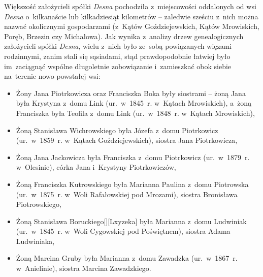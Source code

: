 Większość założycieli spółki \emph{Desna} pochodziła z~miejscowości oddalonych
od wsi \emph{Desna} o~kilkanaście lub kilkadziesiąt kilometrów -- zaledwie
sześciu z~nich można nazwać okolicznymi gospodarzami (z~Kątów Goździejewskich,
Kątów Mrowiskich, Poręb, Brzezin czy Michałowa). Jak wynika z~analizy drzew
genealogicznych założycieli spółki \emph{Desna}, wielu z~nich było ze~sobą
powiązanych więzami rodzinnymi, zanim stali się sąsiadami, stąd prawdopodobnie
łatwiej było im~zaciągnąć wspólne długoletnie zobowiązanie i~zamieszkać obok
siebie na~terenie nowo powstałej wsi:

\begin{itemize}
    \item Żony Jana Piotrkowicza oraz Franciszka
    Boka były siostrami -- żoną
    Jana była Krystyna
    z~domu Link (ur.~w~1845~r. w~Kątach Mrowiskich), a~żoną
    Franciszka była Teofila
    z~domu Link (ur.~w~1848~r. w~Kątach Mrowiskich),
    \item Żoną Stanisława Wichrowskiego była Józefa z~domu Piotrkowicz (ur.~w~1859~r. w~Kątach Goździejewskich),
    siostra Jana Piotrkowicza,
    \item Żoną Jana Jackowicza była
    Franciszka
    z~domu Piotrkowicz (ur.~w~1879~r. w~Olesinie), córka
    Jana
    i~Krystyny
    Piotrkowiczów,
    \item Żoną Franciszka Kutrowskiego była Marianna Paulina z~domu Piotrowska
    (ur.~w~1875~r. w~Woli Rafałowskiej pod Mrozami), siostra
    Bronisława Piotrowskiego,
    \item Żoną Stanisława Boruckiego[][Lxyzeka]
    była Marianna z~domu Ludwiniak (ur.~w~1845~r. w~Woli Cygowskiej pod
    Poświętnem), siostra Adama
    Ludwiniaka,
    \item Żoną Marcina Gruby
    była Marianna
    z~domu Zawadzka (ur.~w~1867~r. w~Anielinie), siostra Marcina
    Zawadzkiego.
\end{itemize}

